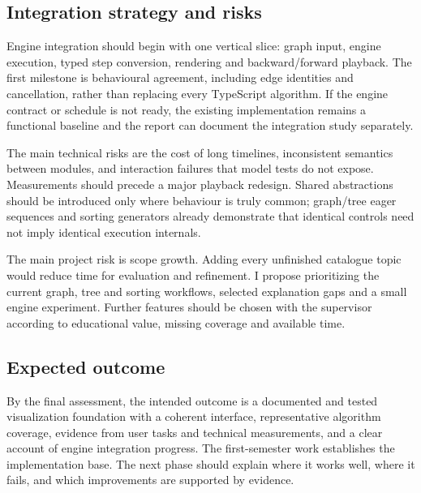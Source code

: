 \documentclass[11pt,a4paper]{article}
\newcommand{\page}{\par\penalty0 \ifdim\pagetotal>.72\textheight\clearpage\else\vspace{8pt}\fi}
\begin{document}
\subsection{Integration strategy and risks}
Engine integration should begin with one vertical slice: graph input, engine execution, typed step conversion, rendering and backward/forward playback. The first milestone is behavioural agreement, including edge identities and cancellation, rather than replacing every TypeScript algorithm. If the engine contract or schedule is not ready, the existing implementation remains a functional baseline and the report can document the integration study separately.

The main technical risks are the cost of long timelines, inconsistent semantics between modules, and interaction failures that model tests do not expose. Measurements should precede a major playback redesign. Shared abstractions should be introduced only where behaviour is truly common; graph/tree eager sequences and sorting generators already demonstrate that identical controls need not imply identical execution internals.

The main project risk is scope growth. Adding every unfinished catalogue topic would reduce time for evaluation and refinement. I propose prioritizing the current graph, tree and sorting workflows, selected explanation gaps and a small engine experiment. Further features should be chosen with the supervisor according to educational value, missing coverage and available time.

\subsection{Expected outcome}
By the final assessment, the intended outcome is a documented and tested visualization foundation with a coherent interface, representative algorithm coverage, evidence from user tasks and technical measurements, and a clear account of engine integration progress. The first-semester work establishes the implementation base. The next phase should explain where it works well, where it fails, and which improvements are supported by evidence.

\page
\begingroup
\small
\setlength{\parskip}{3pt}


\endgroup
\end{document}
